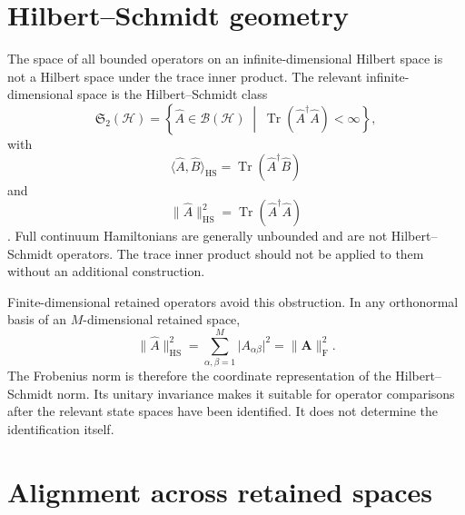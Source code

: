 \section{Hilbert--Schmidt geometry}

The space of all bounded operators on an infinite-dimensional Hilbert space is
not a Hilbert space under the trace inner product. The relevant
infinite-dimensional space is the Hilbert--Schmidt class
\begin{equation}
    \mathfrak S_2(\mathcal H)
    =
    \left\{
        \hat A\in\mathcal B(\mathcal H)
        \;\middle|\;
        \operatorname{Tr}(\hat A^\dagger\hat A)<\infty
    \right\},
\end{equation}
with
\begin{equation}
    \langle\hat A,\hat B\rangle_{\mathrm{HS}}
    =
    \operatorname{Tr}(\hat A^\dagger\hat B)
\end{equation}
and
\begin{equation}
    \lVert\hat A\rVert_{\mathrm{HS}}^2
    =
    \operatorname{Tr}(\hat A^\dagger\hat A)
\end{equation}
\cite{simon2005}. Full continuum Hamiltonians are generally unbounded and are
not Hilbert--Schmidt operators. The trace inner product should not be applied
to them without an additional construction.

Finite-dimensional retained operators avoid this obstruction. In any
orthonormal basis of an $M$-dimensional retained space,
\begin{equation}
    \lVert\hat A\rVert_{\mathrm{HS}}^2
    =
    \sum_{\alpha,\beta=1}^{M}
    \lvert A_{\alpha\beta}\rvert^2
    =
    \lVert\mathbf A\rVert_{\mathrm F}^2.
\end{equation}
The Frobenius norm is therefore the coordinate representation of the
Hilbert--Schmidt norm. Its unitary invariance makes it suitable for operator
comparisons after the relevant state spaces have been identified. It does not
determine the identification itself.

\section{Alignment across retained spaces}


